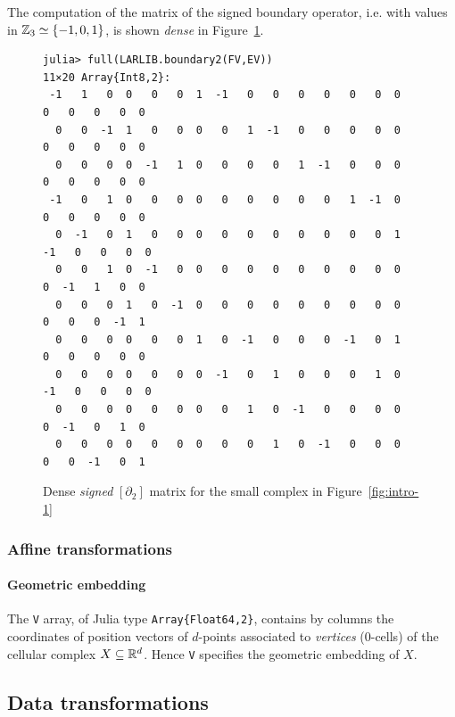 \begin{example}

The computation of the matrix of the signed boundary operator, i.e. with values in $\mathbb{Z}_3\simeq\{-1,0,1\}$, is shown \emph{dense} in Figure~\ref{fig:intro-3}.

\begin{figure}[htbp] %
\small\begin{verbatim}
julia> full(LARLIB.boundary2(FV,EV))
11×20 Array{Int8,2}:
 -1   1   0  0   0   0  1  -1   0   0   0   0   0   0  0   0   0   0   0  0
  0   0  -1  1   0   0  0   0   1  -1   0   0   0   0  0   0   0   0   0  0
  0   0   0  0  -1   1  0   0   0   0   1  -1   0   0  0   0   0   0   0  0
 -1   0   1  0   0   0  0   0   0   0   0   0   1  -1  0   0   0   0   0  0
  0  -1   0  1   0   0  0   0   0   0   0   0   0   0  1  -1   0   0   0  0
  0   0   1  0  -1   0  0   0   0   0   0   0   0   0  0   0  -1   1   0  0
  0   0   0  1   0  -1  0   0   0   0   0   0   0   0  0   0   0   0  -1  1
  0   0   0  0   0   0  1   0  -1   0   0   0  -1   0  1   0   0   0   0  0
  0   0   0  0   0   0  0  -1   0   1   0   0   0   1  0  -1   0   0   0  0
  0   0   0  0   0   0  0   0   1   0  -1   0   0   0  0   0  -1   0   1  0
  0   0   0  0   0   0  0   0   0   1   0  -1   0   0  0   0   0  -1   0  1
\end{verbatim}
   \caption{Dense \emph{signed} $[\partial_2]$ matrix for the small complex in Figure~\ref{fig:intro-1}}
   \label{fig:intro-3}
\end{figure}

\end{example}


\subsubsection{Affine transformations}


\paragraph{Geometric embedding}

The \texttt{V} array, of Julia type \texttt{Array\{Float64,2\}}, contains by columns the coordinates of position vectors of $d$-points associated to \emph{vertices} (0-cells) of the cellular complex $X \subseteq \mathbb{R}^d$. Hence \texttt{V} specifies the geometric embedding of $X$.


\subsection{Data transformations}
\label{sec:transformations}



